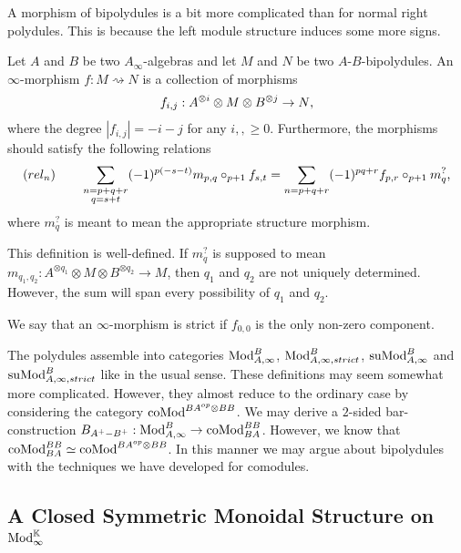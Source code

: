 \documentclass[../thesis.tex]{subfiles}
\begin{document}
            A morphism of bipolydules is a bit more complicated than for normal right polydules. This is because the left module structure induces some more signs.
            
            \begin{definition}
                Let $A$ and $B$ be two $A_\infty$-algebras and let $M$ and $N$ be two $A$-$B$-bipolydules. An $\infty$-morphism $f : M \rightsquigarrow N$ is a collection of morphisms
                \begin{align*}
                    f_{i,j} : A^{\otimes i} \otimes M \otimes B^{\otimes j} \rightarrow N\tt{,}
                \end{align*}
                where the degree $|f_{i,j}| = -i-j$ for any $i,, \geq 0$. Furthermore, the morphisms should satisfy the following relations
                \begin{align*}
                    (rel_n)\qquad \sum_{\substack{n = p + q + r \\ q = s + t}}(-1)^{p(-s-t)}m_{p,q}\circ_{p+1}f_{s,t} = \sum_{n = p + q + r}(-1)^{pq + r}f_{p,r} \circ_{p+1} m^?_q\tt{,}
                \end{align*}
                where $m^?_q$ is meant to mean the appropriate structure morphism.
            \end{definition}

            This definition is well-defined. If $m^?_q$ is supposed to mean $m_{q_1,q_2} : A^{\otimes q_1} \otimes M \otimes B^{\otimes q_2} \rightarrow M$, then $q_1$ and $q_2$ are not uniquely determined. However, the sum will span every possibility of $q_1$ and $q_2$.

            We say that an $\infty$-morphism is strict if $f_{0,0}$ is the only non-zero component.

            The polydules assemble into categories $\tt{Mod}_{A,\infty}^B$, $\tt{Mod}_{A,\infty,strict}^B$, $\tt{suMod}_{A,\infty}^B$ and $\tt{suMod}_{A,\infty,strict}^B$ like in the usual sense. These definitions may seem somewhat more complicated. However, they almost reduce to the ordinary case by considering the category $\tt{coMod}^{BA^{op}\otimes BB}$. We may derive a $2$-sided bar-construction $B_{A^+-B^+} : \tt{Mod}_{A,\infty}^B \rightarrow \tt{coMod}^{BB}_{BA}$. However, we know that $\tt{coMod}_{BA}^{BB} \simeq \tt{coMod}^{BA^{op}\otimes BB}$. In this manner we may argue about bipolydules with the techniques we have developed for comodules.

        \subsection{A Closed Symmetric Monoidal Structure on $\tt{Mod}_\infty^{\mathbb{K}}$}
\end{document}
